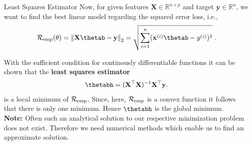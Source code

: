 \documentclass[11pt,compress,t,notes=noshow, xcolor=table]{beamer}
\begin{document}
\begin{vbframe}{Least Squares Estimator}
Now, for given features $\mathbf{X} \in \mathbb{R}^{n\times p}$ and target $\mathbf{y} \in \mathbb{R}^n$, we want to find the best linear model regarding the squared error loss, i.e.,
\[\risket = \left\Vert \mathbf{X}\thetab - \mathbf{y}\right\Vert_2 = \sqrt{\sum^n_{i=1} (\mathbf{x}^{(i)}\thetab - y^{(i)})^2}\;.\]

With the sufficient condition for continously differentiable functions it can be shown that the \textbf{least squares estimator}
\[\thetabh = (\mathbf{X}^\top\mathbf{X})^{-1}\mathbf{X}^\top\mathbf{y}.\]
is a local minimum of $\mathcal{R}_{\text{emp}}$. Since, here, $\mathcal{R}_{\text{emp}}$ is a convex function it follows that there is only one minimum. Hence $\thetabh$ is the global minimum. \\

\lz \textbf{Note:} Often such an analytical solution to our respective minimization problem does not exist. Therefore we need numerical methods which enable us to find an approximate solution.

\end{vbframe}
\end{document}
